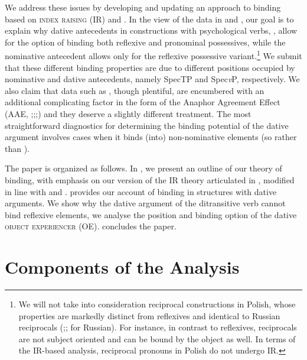 \documentclass[output=paper,modfonts,nonflat
]{langsci/langscibook}
\begin{document}
\noindent We address these issues by developing and updating an approach to binding based on  \textsc{index raising} (IR) and \cite{despic2013,despic2015}. In the view of the data in  and , our goal is to explain why dative antecedents in constructions with psychological verbs, , allow for the option of binding both reflexive and pronominal possessives, while the nominative antecedent allows only for the reflexive possessive variant.\footnote{\label{fn2}We will not take into consideration reciprocal constructions in Polish, whose properties are markedly distinct from reflexives and identical to Russian reciprocals (\citealt{willim1989};\citealt{reinders1991};\citealt{rappaport1986} for Russian). For instance, in contrast to reflexives, reciprocals are not subject oriented and can be bound by the object as well. In terms of the IR-based analysis, reciprocal pronouns in Polish do not undergo IR.} We submit that these different binding properties are due to different positions occupied by nominative and dative antecedents, namely SpecTP and Spec\textit{v}P, respectively. We also claim that data such as , though plentiful, are encumbered with an additional complicating factor in the form of the Anaphor Agreement Effect (AAE, \citealt{rizzi1990};\citealt{progovac1992,progovac1993};\citealt{woolford1999};\citealt{reuland2011}) and they deserve a slightly different treatment. The most straightforward diagnostics for determining the binding potential of the dative argument involves cases when it binds (into) non-nominative elements (so  rather than ).

The paper is organized as follows. In , we present an outline of our theory of binding, with emphasis on our version of the IR theory articulated in \cite{nikolaeva2014}, modified in line with \cite{boskovic2005locality,boskovic2012,boskovic2013,boskovic2014} and \cite{despic2011,despic2013,despic2015}.  provides our account of binding in structures with dative arguments. We show why the dative argument of the ditransitive verb cannot bind reflexive elements, we analyse the position and binding option of the dative \textsc{object experiencer} (OE).  concludes the paper.

\section{Components of the Analysis} \label{sec:witkos:s2}
\end{document}

